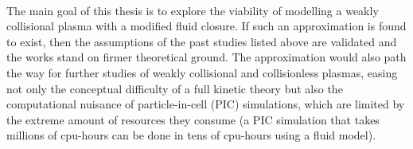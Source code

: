 \\
The main goal of this thesis is to explore the viability of modelling a weakly collisional plasma with a modified fluid closure. If such an approximation is found to exist, then the assumptions of the past studies listed above are validated and the works stand on firmer theoretical ground. The approximation would also path the way for further studies of weakly collisional and collisionless plasmas, easing not only the conceptual difficulty of a full kinetic theory but also the computational nuisance of particle-in-cell (PIC) simulations, which are limited by the extreme amount of resources they consume (a PIC simulation that takes millions of cpu-hours can be done in tens of cpu-hours using a fluid model).


